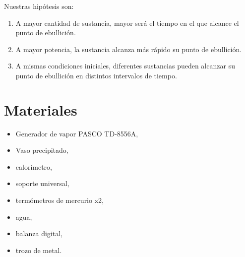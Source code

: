 \documentclass[a4paper, 12p]{article}
\begin{document}
Nuestras hipótesis son:
\begin{enumerate}
      \item A mayor cantidad de sustancia, mayor será el tiempo en el que alcance el punto de ebullición.
      \item  A mayor potencia, la sustancia alcanza más rápido su punto de ebullición.
      \item A mismas condiciones iniciales, diferentes sustancias pueden alcanzar su punto de ebullición en distintos intervalos de tiempo.
      
      
\end{enumerate}


\section{Materiales}


\begin{itemize}
      \item Generador de vapor PASCO TD-8556A,
      \item Vaso precipitado,
      \item calorímetro,
       \item soporte universal,
      \item termómetros de mercurio x2,
      \item agua,
      \item balanza digital,
      \item trozo de metal.
\end{itemize}
\end{document}

